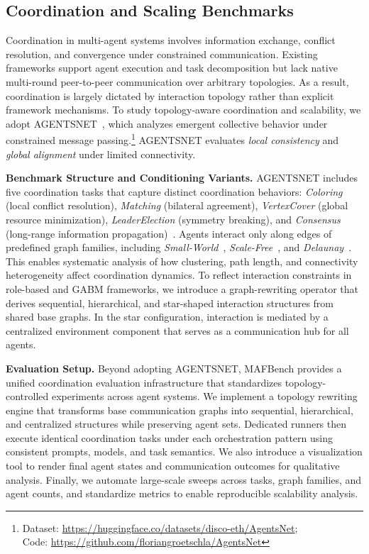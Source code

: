 \subsection{Coordination and Scaling Benchmarks}
\label{subsec:bench_coordination}

Coordination in multi-agent systems involves information exchange, conflict resolution, and convergence under constrained communication. Existing frameworks support agent execution and task decomposition but lack native multi-round peer-to-peer communication over arbitrary topologies. As a result, coordination is largely dictated by interaction topology rather than explicit framework mechanisms. To study topology-aware coordination and scalability, we adopt AGENTSNET~\cite{coordinationcollaborativereasoning}, which analyzes emergent collective behavior under constrained message passing.\footnote{Dataset: \url{https://huggingface.co/datasets/disco-eth/AgentsNet}; \\ Code: \url{https://github.com/floriangroetschla/AgentsNet}} AGENTSNET evaluates \emph{local consistency} and \emph{global alignment} under limited connectivity.




\noindent\textbf{Benchmark Structure and Conditioning Variants.}
AGENTSNET includes five coordination tasks that capture distinct coordination behaviors: \emph{Coloring} (local conflict resolution), \emph{Matching} (bilateral agreement), \emph{VertexCover} (global resource minimization), \emph{LeaderElection} (symmetry breaking), and \emph{Consensus} (long-range information propagation)~\cite{coordinationcollaborativereasoning}. Agents interact only along edges of predefined graph families, including \emph{Small-World}~\cite{watts1998collective}, \emph{Scale-Free}~\cite{scale_free}, and \emph{Delaunay}~\cite{delaunay}. This enables systematic analysis of how clustering, path length, and connectivity heterogeneity affect coordination dynamics. To reflect interaction constraints in role-based and GABM frameworks, we introduce a graph-rewriting operator that derives sequential, hierarchical, and star-shaped interaction structures from shared base graphs. In the star configuration, interaction is mediated by a centralized environment component that serves as a communication hub for all agents.

\noindent\textbf{Evaluation Setup.}
Beyond adopting AGENTSNET, MAFBench provides a unified coordination evaluation infrastructure that standardizes topology-controlled experiments across agent systems. We implement a topology rewriting engine that transforms base communication graphs into sequential, hierarchical, and centralized structures while preserving agent sets. Dedicated runners then execute identical coordination tasks under each orchestration pattern using consistent prompts, models, and task semantics. We also introduce a visualization tool to render final agent states and communication outcomes for qualitative analysis. Finally, we automate large-scale sweeps across tasks, graph families, and agent counts, and standardize metrics to enable reproducible scalability analysis.


